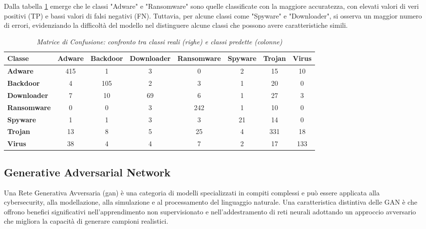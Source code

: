 Dalla tabella \ref{tab:confusion_matrix} emerge che le classi "Adware" e "Ransomware" sono quelle classificate con la maggiore accuratezza, con elevati valori di veri positivi (TP) e bassi valori di falsi negativi (FN). Tuttavia, per alcune classi come "Spyware" e "Downloader", si osserva un maggior numero di errori, evidenziando la difficoltà del modello nel distinguere alcune classi che possono avere caratteristiche simili.
\begin{table}[ht]
    \centering
    \hspace*{-2cm} 
    \begin{tabular}{@{}|l|c|c|c|c|c|c|c|@{}}
    \toprule
    \textbf{Classe}      & \textbf{Adware} & \textbf{Backdoor} & \textbf{Downloader} & \textbf{Ransomware} & \textbf{Spyware} & \textbf{Trojan} & \textbf{Virus} \\ \midrule
    \textbf{Adware}      & 415 & 1   & 3   & 0   & 2   & 15  & 10  \\\midrule
    \textbf{Backdoor}    & 4   & 105 & 2   & 3   & 1   & 20  & 0   \\\midrule
    \textbf{Downloader}  & 7   & 10  & 69  & 6   & 1   & 27  & 3   \\\midrule
    \textbf{Ransomware}  & 0   & 0   & 3   & 242 & 1   & 10  & 0   \\\midrule
    \textbf{Spyware}     & 1   & 1   & 3   & 3   & 21  & 14  & 0   \\\midrule
    \textbf{Trojan}      & 13  & 8   & 5   & 25  & 4   & 331 & 18  \\\midrule
    \textbf{Virus}       & 38  & 4   & 4   & 7   & 2   & 17  & 133 \\\bottomrule
    \end{tabular}
    \vspace{.2cm}
    \caption{\emph{Matrice di Confusione: confronto tra classi reali (righe) e classi predette (colonne)}}
    \label{tab:confusion_matrix}
\end{table}
    
\newpage
\subsection{Generative Adversarial Network}
Una Rete Generativa Avversaria (\gls{gan}) è una categoria di modelli specializzati in compiti complessi e può essere applicata alla \gls{cybersecurity}, alla modellazione, alla simulazione e al processamento del linguaggio naturale. Una caratteristica distintiva delle GAN è che offrono benefici significativi nell'apprendimento non supervisionato e nell'addestramento di reti neurali adottando un approccio avversario che migliora la capacità di generare campioni realistici.

